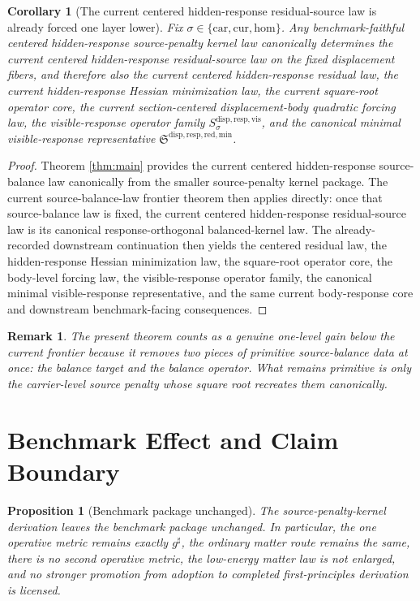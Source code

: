 \documentclass[11pt]{article}
\newcommand{\CompletedMetric}{g^{\sharp}}
\newcommand{\Car}{\mathrm{car}}
\newcommand{\Cur}{\mathrm{cur}}
\newcommand{\Hom}{\mathrm{hom}}
\newcommand{\VisibleResponseOperator}[1]{S_{#1}^{\mathrm{disp,resp,vis}}}
\newcommand{\MinimalReducedStructure}{\mathfrak S^{\mathrm{disp,resp,red,min}}}
\newtheorem{proposition}{Proposition}
\newtheorem{remark}{Remark}
\newtheorem{corollary}{Corollary}
\begin{document}
\begin{corollary}[The current centered hidden-response residual-source law is already forced one layer lower]
\label{cor:downstream}
Fix \(\sigma\in\{\Car,\Cur,\Hom\}\). Any benchmark-faithful centered hidden-response source-penalty kernel law canonically determines the current centered hidden-response residual-source law on the fixed displacement fibers, and therefore also the current centered hidden-response residual law, the current hidden-response Hessian minimization law, the current square-root operator core, the current section-centered displacement-body quadratic forcing law, the visible-response operator family \(\VisibleResponseOperator{\sigma}\), and the canonical minimal visible-response representative \(\MinimalReducedStructure\).
\end{corollary}

\begin{proof}
Theorem \ref{thm:main} provides the current centered hidden-response source-balance law canonically from the smaller source-penalty kernel package. The current source-balance-law frontier theorem then applies directly: once that source-balance law is fixed, the current centered hidden-response residual-source law is its canonical response-orthogonal balanced-kernel law. The already-recorded downstream continuation then yields the centered residual law, the hidden-response Hessian minimization law, the square-root operator core, the body-level forcing law, the visible-response operator family, the canonical minimal visible-response representative, and the same current body-response core and downstream benchmark-facing consequences.
\end{proof}

\begin{remark}
The present theorem counts as a genuine one-level gain below the current frontier because it removes two pieces of primitive source-balance data at once: the balance target and the balance operator. What remains primitive is only the carrier-level source penalty whose square root recreates them canonically.
\end{remark}

\section{Benchmark Effect and Claim Boundary}

\begin{proposition}[Benchmark package unchanged]
\label{prop:boundary}
The source-penalty-kernel derivation leaves the benchmark package unchanged. In particular, the one operative metric remains exactly \(\CompletedMetric\), the ordinary matter route remains the same, there is no second operative metric, the low-energy matter law is not enlarged, and no stronger promotion from adoption to completed first-principles derivation is licensed.
\end{proposition}
\end{document}
